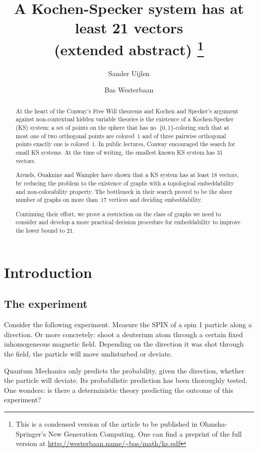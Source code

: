 \documentclass[adraft,copyright,creativecommons]{eptcs}
\title{A Kochen-Specker system has at least 21 vectors\\
        {\small (extended abstract)
            \footnote{This is a condensed version of the article
                        to be published in Ohmsha-Springer's
                        New Generation Computing.
                    One can find a preprint of the full version at
                    \url{http://westerbaan.name/\~bas/math/ks.pdf}}}}
\author{Sander Uijlen
    \institute{Radboud Universiteit}
    \email{suijlen@cs.ru.nl}
\and
    Bas Westerbaan
    \institute{Radboud Universiteit}
    \email{bwesterb@cs.ru.nl}}
\theoremstyle{definition}
\theoremstyle{remark}
\begin{document}
\maketitle

\begin{abstract}
    At the heart of the Conway's Free Will theorems and Kochen and Specker's
        argument against non-contextual hidden variable theories
    is the existence of a Kochen-Specker (KS) system:
    a set of points on the sphere
    that has no~$\{0,1\}$-coloring such that
    at most one of two orthogonal points are colored~$1$
    and of three pairwise orthogonal points exactly one
    is colored~$1$.
    In public lectures, Conway encouraged the search for small
    KS systems.
    At the time of writing, the smallest known
    KS system has 31 vectors.  

    Arends, Ouaknine and Wampler have shown that a KS system has at least
    18 vectors, by reducing the problem to the existence of graphs
    with a topological embeddability and non-colorability property.
    The bottleneck in their search
    proved to be the sheer number of graphs on more than~$17$
    vertices and deciding embeddability.

    Continuing their effort, we prove a restriction on the class of graphs
    we need to consider and develop a more practical decision procedure for
    embeddability to improve the lower bound to 21.
\end{abstract}

\clearpage
    
\section{Introduction}

\subsection{The experiment}

Consider the following experiment. Measure the SPIN of a spin 1
particle along a direction. Or more concretely: shoot a deuterium
atom through a certain fixed inhomogeneous magnetic field. Depending
on the direction it was shot through the field, the particle will
move undisturbed or deviate.

Quantum Mechanics only predicts the probability, given the direction,
whether the particle will deviate.
Its probabilistic prediction has been thoroughly tested.
One wonders: is there a deterministic theory predicting the
outcome of this experiment?
\end{document}
